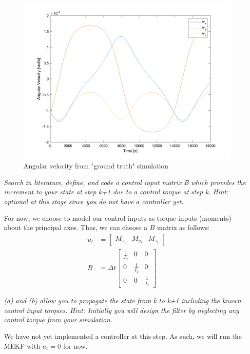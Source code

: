 \begin{figure}[H]
\centering
\includegraphics[scale=0.6]{Images/ps7_problem5a_angvel_sim.png}
\caption{Angular velocity from "ground truth" simulation}
\label{fig:ps7_problem5a_angvel_sim}
\end{figure}

\textit{Search in literature, define, and code a control input matrix B which provides the increment to your state at step k+1 due to a control torque at step k. Hint: optional at this stage since you do not have a controller yet.}

For now, we choose to model our control inputs as torque inputs (moments) about the principal axes. Thus, we can choose a $B$ matrix as follows:
\begin{align*}
    u_{t} &= \begin{bmatrix}
        M_{x_{t}} & M_{y_{t}} & M_{z_{t}}
    \end{bmatrix} \\
    B &= \Delta t \begin{bmatrix}
        \frac{1}{I_{x}} & 0 & 0 \\
        0 & \frac{1}{I_{y}} & 0 \\
        0 & 0 & \frac{1}{I_{z}}
    \end{bmatrix}
\end{align*}

\textit{(a) and (b) allow you to propagate the state from k to k+1 including the known control input torques. Hint: Initially you will design the filter by neglecting any control torque from your simulation.}

We have not yet implemented a controller at this step. As such, we will run the MEKF with $u_{t} = 0$ for now.

